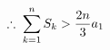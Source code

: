 \documentclass[preview]{standalone}
\begin{document}
\begin{align*}
\special{dvisvgm:raw <g id='unique000'>}\therefore\; \sum_{k=1}^{n}S_k>\frac{2n}{3}a_1\special{dvisvgm:raw </g>}
\end{align*}
\end{document}
